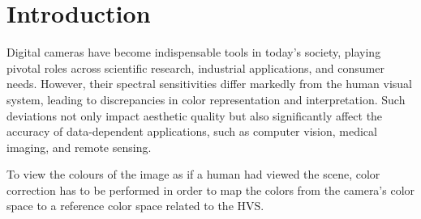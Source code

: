 \chapter{Introduction}%
\label{ch:introduction}

Digital cameras have become indispensable tools in today's society, playing pivotal roles across scientific research, industrial applications, and consumer needs. However, their spectral sensitivities differ markedly from the human visual system, leading to discrepancies in color representation and interpretation. Such deviations not only impact aesthetic quality but also significantly affect the accuracy of data-dependent applications, such as computer vision, medical imaging, and remote sensing. 

To view the colours of the image as if a human had viewed the scene, color correction has to be performed in order to map the colors from the camera's color space to a reference color space related to the HVS.


